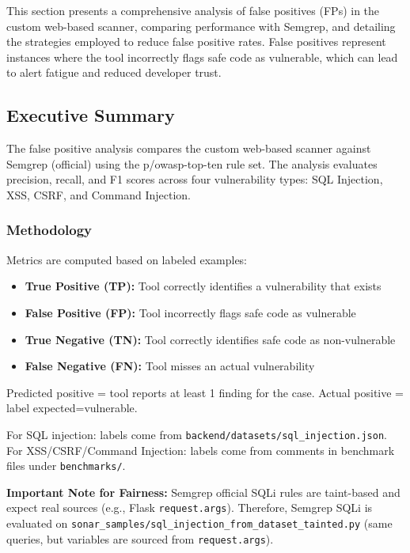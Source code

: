This section presents a comprehensive analysis of false positives (FPs) in the custom web-based scanner, comparing performance with Semgrep, and detailing the strategies employed to reduce false positive rates. False positives represent instances where the tool incorrectly flags safe code as vulnerable, which can lead to alert fatigue and reduced developer trust.

\subsection{Executive Summary}
\label{sec:fp_executive_summary}

The false positive analysis compares the custom web-based scanner against Semgrep (official) using the p/owasp-top-ten rule set. The analysis evaluates precision, recall, and F1 scores across four vulnerability types: SQL Injection, XSS, CSRF, and Command Injection.

\subsubsection{Methodology}
\label{sec:fp_methodology}

Metrics are computed based on labeled examples:
\begin{itemize}
	\item \textbf{True Positive (TP):} Tool correctly identifies a vulnerability that exists
	\item \textbf{False Positive (FP):} Tool incorrectly flags safe code as vulnerable
	\item \textbf{True Negative (TN):} Tool correctly identifies safe code as non-vulnerable
	\item \textbf{False Negative (FN):} Tool misses an actual vulnerability
\end{itemize}

Predicted positive = tool reports at least 1 finding for the case. Actual positive = label expected=vulnerable.

For SQL injection: labels come from \texttt{backend/datasets/sql\_injection.json}. For XSS/CSRF/Command Injection: labels come from comments in benchmark files under \texttt{benchmarks/}.

\textbf{Important Note for Fairness:} Semgrep official SQLi rules are taint-based and expect real sources (e.g., Flask \texttt{request.args}). Therefore, Semgrep SQLi is evaluated on \texttt{sonar\_samples/sql\_injection\_from\_dataset\_tainted.py} (same queries, but variables are sourced from \texttt{request.args}).

